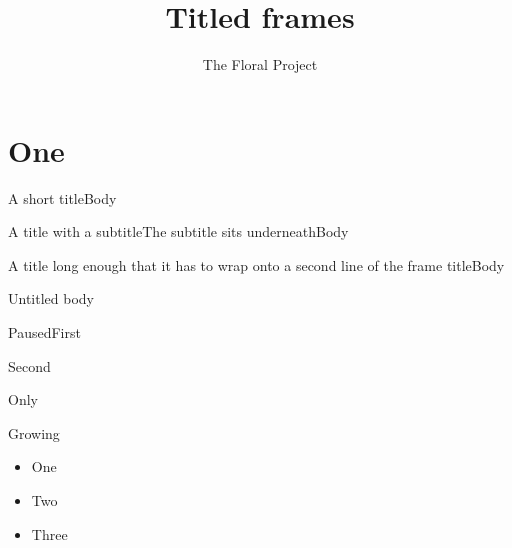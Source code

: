 \documentclass[aspectratio=169]{beamer}
\title{Titled frames}
\author{The Floral Project}
\date{}
\begin{document}
\begin{frame}[plain]\titlepage\end{frame}
\section{One}
\begin{frame}{A short title}Body\end{frame}
\begin{frame}{A title with a subtitle}{The subtitle sits underneath}Body\end{frame}
\begin{frame}{A title long enough that it has to wrap onto a second line of the frame title}Body\end{frame}
\begin{frame}Untitled body\end{frame}
\begin{frame}{Paused}First\pause\par Second\end{frame}
\begin{frame}{Only}\end{frame}
\begin{frame}{Growing}
  \begin{itemize}\item<+-> One\item<+-> Two\item<+-> Three\end{itemize}
\end{frame}
\end{document}
